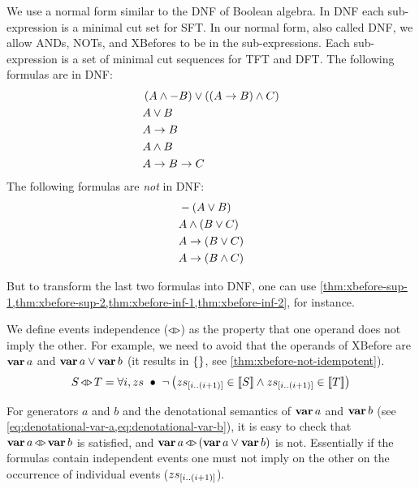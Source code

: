 \documentclass[12pt,openright,twoside,a4paper,oldfontcommands,english,brazil,final]{abntex2}
\theoremstyle{theo}
\newcommand{\slice}[3]{\ensuremath #1_{\left[#2..#3\right]}}
\def\varop{\ensuremath\operatorname{\mathbf{var}}}
\newcommand{\var}[1]{\ensuremath\varop #1}
\def\xbeforeop{\ensuremath\rightarrow}
\newcommand{\xbefore}[2]{\ensuremath #1 \xbeforeop #2 }
\def\independenteventsop{\ensuremath\operatorname{\triangleleft\triangleright}}
\newcommand{\independentevents}[2]{\ensuremath #1 \independenteventsop #2}
\def\False{\ensuremath\operatorname{\left\{\right\}}}
\newcommand{\parsin}[1]{\ensuremath\left( #1 \right)}
\newcommand{\denote}[1]{\ensuremath\left[\!\left[#1\right]\!\right]}
\begin{document}
We use a normal form similar to the \ac{DNF} of Boolean algebra.
In \ac{DNF} each sub-expression is a minimal cut set for \ac{SFT}.
In our normal form, also called \ac{DNF}, we allow \acp{AND}, \acp{NOT}, and \acp{XBefore} to be in the sub-expressions.
Each sub-expression is a set of minimal cut sequences for \ac{TFT} and \ac{DFT}.
The following formulas are in \ac{DNF}:
%
\begin{align*}
&\parsin{A \land -B} \lor \parsin{\parsin{\xbefore{A}{B}} \land C}\\
&A \lor B\\
&\xbefore{A}{B}\\
&A \land B\\
&\xbefore{\xbefore{A}{B}}{C}
\end{align*}
%
The following formulas are \emph{not} in \ac{DNF}:
%
\begin{align*}
&-\parsin{A \lor B}\\
&A \land \parsin{B \lor C}\\
&\xbefore{A}{\parsin{B \lor C}}\\
&\xbefore{A}{\parsin{B \land C}}
\end{align*}

\begin{sloppypar}
But to transform the last two formulas into \ac{DNF}, one can use \cref{thm:xbefore-sup-1,thm:xbefore-sup-2,thm:xbefore-inf-1,thm:xbefore-inf-2}, for instance.
\end{sloppypar}

We define events independence ($\independenteventsop$) as the property that one operand does not imply the other.
For example, we need to avoid that the operands of \ac{XBefore} are $\var{a}$ and $\var{a} \lor \var{b}$ (it results in $\False$, see \cref{thm:xbefore-not-idempotent}).
%
\begin{equation}
\label{law:independent-events}
\independentevents{S}{T} = \forall i, zs ~\bullet~
  \lnot \left(
    \slice{zs}{i}{\left(i+1\right)} \in \denote{S} \land
    \slice{zs}{i}{\left(i+1\right)} \in \denote{T}
  \right)
\end{equation}

\begin{sloppypar}
For generators $a$ and $b$ and the denotational semantics of $\var{a}$ and $\var{b}$ (see \cref{eq:denotational-var-a,eq:denotational-var-b}), it is easy to check that $\independentevents{\var{a}}{\var{b}}$ is satisfied, and $\independentevents{\var{a}}{\left(\var{a} \lor \var{b}\right)}$ is not.
Essentially if the formulas contain independent events one must not imply on the other on the occurrence of individual events ($\slice{zs}{i}{\left(i+1\right)}$).
\end{sloppypar}
\end{document}
